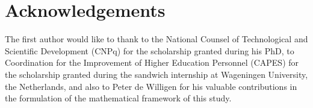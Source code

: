 \section*{Acknowledgements}

The first author would like to thank to the National Counsel of Technological and Scientific Development (CNPq) for the scholarship granted during his PhD, to Coordination for the Improvement of Higher Education Personnel (CAPES) for the scholarship granted during the sandwich internship at Wageningen University, the Netherlands, and also to Peter de Willigen for his valuable contributions in the formulation of the mathematical framework of this study.
